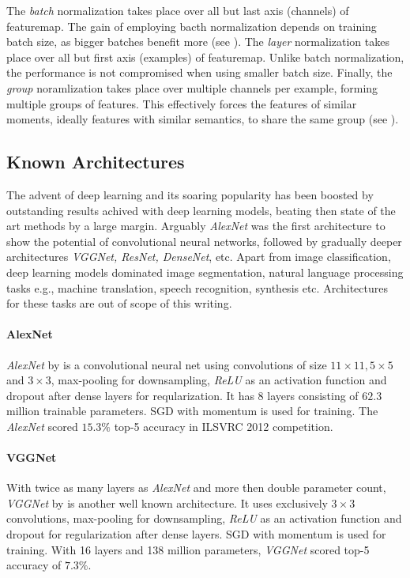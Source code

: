 The \emph{batch} normalization takes place over all but last axis (channels) of featuremap. The gain of employing bacth normalization depends on training batch size, as bigger batches benefit more (see \cite{DBLP:journals/corr/IoffeS15}). The \emph{layer} normalization takes place over all but first axis (examples) of featuremap. Unlike batch normalization, the performance is not compromised when using smaller batch size. Finally, the \emph{group} noramlization takes place over multiple channels per example, forming multiple groups of features. This effectively forces the features of similar moments, ideally features with similar semantics, to share the same group (see \cite{DBLP:journals/corr/abs-1803-08494}).

\subsection{Known Architectures}
The advent of deep learning and its soaring popularity has been boosted by outstanding results achived with deep learning models, beating then state of the art methods by a large margin. Arguably \emph{AlexNet} was the first architecture to show the potential of convolutional neural networks, followed by gradually deeper architectures \emph{VGGNet, ResNet, DenseNet}, etc. Apart from image classification, deep learning models dominated image segmentation, natural language processing tasks e.g., machine translation, speech recognition, synthesis etc. Architectures for these tasks are out of scope of this writing.

\paragraph{AlexNet}
\emph{AlexNet} by \cite{alexnet} is a convolutional neural net using convolutions of size $11 \times 11, 5 \times 5$ and $3 \times 3$, max-pooling for downsampling, \emph{ReLU} as an activation function and dropout after dense layers for reqularization. It has 8 layers consisting of $62.3$ million trainable parameters. SGD with momentum is used for training. The \emph{AlexNet} scored $15.3\%$ top-5 accuracy in ILSVRC 2012 competition.

\paragraph{VGGNet}
With twice as many layers as \emph{AlexNet} and more then double parameter count, \emph{VGGNet} by \cite{DBLP:journals/corr/SimonyanZ14a} is another well known architecture. It uses exclusively $3 \times 3$ convolutions, max-pooling for downsampling, \emph{ReLU} as an activation function and dropout for regularization after dense layers. SGD with momentum is used for training. With 16 layers and 138 million parameters, \emph{VGGNet} scored top-5 accuracy of $7.3\%$.

